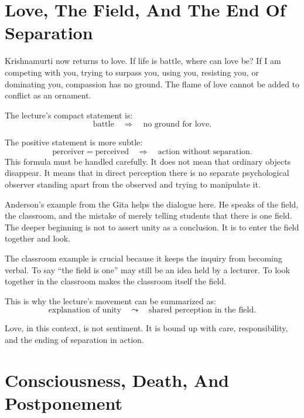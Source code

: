 \section{Love, The Field, And The End Of Separation}

Krishnamurti now returns to love. If life is battle, where can love be? If I am competing with you, trying to surpass you, using you, resisting you, or dominating you, compassion has no ground. The flame of love cannot be added to conflict as an ornament.

The lecture's compact statement is:
\begin{equation}
\text{battle} \quad \Longrightarrow \quad \text{no ground for love}.
\end{equation}

The positive statement is more subtle:
\begin{equation}
\text{perceiver} = \text{perceived}
   \quad \Longrightarrow \quad
\text{action without separation}.
\end{equation}
This formula must be handled carefully. It does not mean that ordinary objects disappear. It means that in direct perception there is no separate psychological observer standing apart from the observed and trying to manipulate it.

Anderson's example from the Gita helps the dialogue here. He speaks of the field, the classroom, and the mistake of merely telling students that there is one field. The deeper beginning is not to assert unity as a conclusion. It is to enter the field together and look.

\begin{remark}
The classroom example is crucial because it keeps the inquiry from becoming verbal. To say ``the field is one'' may still be an idea held by a lecturer. To look together in the classroom makes the classroom itself the field.
\end{remark}

This is why the lecture's movement can be summarized as:
\begin{equation}
\text{explanation of unity}
   \quad \leadsto \quad
\text{shared perception in the field}.
\end{equation}

Love, in this context, is not sentiment. It is bound up with care, responsibility, and the ending of separation in action.

\section{Consciousness, Death, And Postponement}

